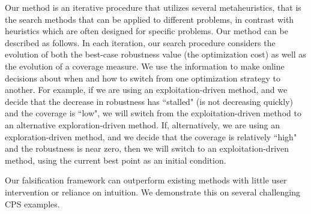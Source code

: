 Our method is an iterative procedure that utilizes several
metaheuristics, that is the search methods that can be applied to
different problems, in contrast with heuristics which are often
designed for specific problems. Our method can be described as follows. 
In each iteration, our
search procedure considers the evolution of both the best-case
robustness value (the optimization cost) as well as the evolution of a
coverage measure.  We use the information to make online decisions
about when and how to switch from one optimization strategy to
another.  For example, if we are using an exploitation-driven method,
and we decide that the decrease in robustness has ``stalled" (is not
decreasing quickly) and the coverage is ``low", we will switch from
the exploitation-driven method to an alternative exploration-driven
method.  If, alternatively, we are using an exploration-driven method,
and we decide that the coverage is relatively ``high" and the
robustness is near zero, then we will switch to an exploitation-driven
method, using the current best point as an initial condition.
 
Our falsification framework can outperform existing methods with little user intervention or reliance on intuition. We demonstrate this on several 
challenging CPS examples.







